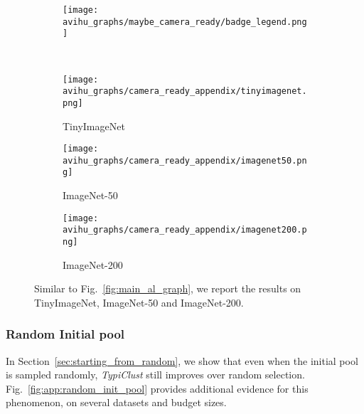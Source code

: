 \documentclass{article}
\begin{document}
\begin{figure}[thb!]
\begin{center}
\begin{subfigure}{.45\textwidth}
  \centering
 \texttt{[image: avihu\_graphs/maybe\_camera\_ready/badge\_legend.png]}
\end{subfigure}
\\
    \begin{subfigure}{.157\textwidth}
      \centering
      \texttt{[image: avihu\_graphs/camera\_ready\_appendix/tinyimagenet.png]}
\caption{TinyImageNet}
    \label{fig:app_more_tinyimagenet}
    \end{subfigure}
    \begin{subfigure}{.157\textwidth}
      \centering
      \texttt{[image: avihu\_graphs/camera\_ready\_appendix/imagenet50.png]}
\caption{ImageNet-50}
    \label{fig:app_more_imagenet_50}
    \end{subfigure}
    \begin{subfigure}{.157\textwidth}
      \centering
      \texttt{[image: avihu\_graphs/camera\_ready\_appendix/imagenet200.png]}
\caption{ImageNet-200}
    \label{fig:app_more_imagenet_100}
    \end{subfigure}
\caption{Similar to Fig.~\ref{fig:main_al_graph}, we report the results on TinyImageNet, ImageNet-50 and ImageNet-200.
}
\label{fig:app_more_imagenet}
\end{center}
\vspace{-.6cm}
\end{figure}

\subsubsection{Random Initial pool}
In Section~\ref{sec:starting_from_random}, we show that even when the initial pool is sampled randomly, \emph{TypiClust} still improves over random selection. Fig.~\ref{fig:app:random_init_pool} provides additional evidence for this phenomenon, on several datasets and budget sizes. 
\end{document}
